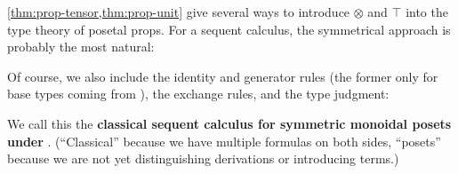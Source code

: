 \documentclass{book}
\let\types\vdash
\def\type{\;\ftype}
\def\unit{\top}%
\def\one{\mathbf{1}}
\let\tensor\otimes
\def\tensorL{\mathord{\tensor}L}
\def\tensorR{\mathord{\tensor}R}
\begin{document}
\cref{thm:prop-tensor,thm:prop-unit} give several ways to introduce $\tensor$ and $\unit$ into the type theory of posetal props.
For a sequent calculus, the symmetrical approach is probably the most natural:
Of course, we also include the identity and generator rules (the former only for base types coming from \cG), the exchange rules, and the type judgment:
We call this the \textbf{classical sequent calculus for symmetric monoidal posets under \cG}.
(``Classical'' because we have multiple formulas on both sides, ``posets'' because we are not yet distinguishing derivations or introducing terms.)
\end{document}
